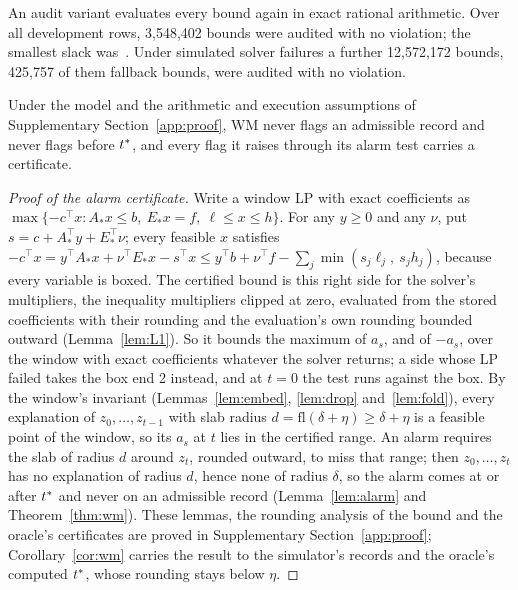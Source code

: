 An audit variant evaluates every bound again in exact rational arithmetic. Over all development rows, 3,548,402 bounds
were audited with no violation; the smallest slack was \,\degC. Under simulated solver failures a further
12,572,172 bounds, 425,757 of them fallback bounds, were audited with no violation.

\begin{proposition}[soundness of WM]\label{prop:wm}
Under the model and the arithmetic and execution assumptions of Supplementary Section~\ref{app:proof}, WM never flags
an admissible record and never flags before $t^{\ast}$, and every flag it raises through its alarm test carries a
certificate.
\end{proposition}
\begin{proof}[Proof of the alarm certificate]
Write a window LP with exact coefficients as $\max\{-c^\top x : A_\ast x\le b,\ E_\ast x = f,\ \ell\le x\le h\}$. For
any $y\ge0$ and any $\nu$, put $s = c + A_\ast^\top y + E_\ast^\top\nu$; every feasible $x$ satisfies $-c^\top x =
y^\top A_\ast x + \nu^\top E_\ast x - s^\top x \le y^\top b + \nu^\top f - \sum_j\min(s_j\ell_j,\ s_jh_j)$, because
every variable is boxed. The certified bound is this right side for the solver's multipliers, the inequality
multipliers clipped at zero, evaluated from the stored coefficients with their rounding and the evaluation's own
rounding bounded outward (Lemma~\ref{lem:L1}). So it bounds the maximum of $a_s$, and of $-a_s$, over the window with
exact coefficients whatever the solver returns; a side whose LP failed takes the box end 2 instead, and at $t = 0$ the
test runs against the box. By the window's invariant (Lemmas~\ref{lem:embed}, \ref{lem:drop} and~\ref{lem:fold}),
every explanation of $z_0,\dots,z_{t-1}$ with slab radius $d = \mathrm{fl}(\delta+\eta)\ge\delta+\eta$ is a feasible
point of the window, so its $a_s$ at $t$ lies in the certified range. An alarm requires the slab of radius $d$ around
$z_t$, rounded outward, to miss that range; then $z_0,\dots,z_t$ has no explanation of radius $d$, hence none of
radius $\delta$, so the alarm comes at or after $t^{\ast}$ and never on an admissible record (Lemma~\ref{lem:alarm} and
Theorem~\ref{thm:wm}). These lemmas, the rounding analysis of the bound and the oracle's certificates are proved in
Supplementary Section~\ref{app:proof}; Corollary~\ref{cor:wm} carries the result to the simulator's records and the
oracle's computed $t^{\ast}$, whose rounding stays below $\eta$.
\end{proof}

